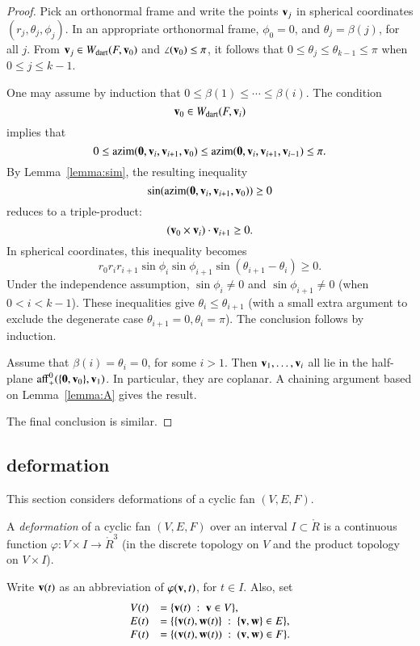 \begin{proof}  
Pick an orthonormal frame and write the points ${\mathbf v}_j$ in spherical coordinates $(r_j,\theta_j,\phi_j)$.  In an appropriate orthonormal frame, $\phi_0=0$, and $\theta_j=\beta(j)$, for all $j$.  From ${\mathbf v}_j\in W_{\text{dart}}(F,{\mathbf v}_0)$ and $\angle({\mathbf v}_0)\le\pi$, it follows that $0\le\theta_j\le\theta_{k-1}\le\pi$ when $0\le j\le k-1$.

 One may assume by induction that $0\le \beta(1)\le\cdots\le \beta(i)$.  The condition
$$
{\mathbf v}_0\in W_{\text{dart}}(F,{\mathbf v}_i)
$$
implies that
$$
0 \le {\operatorname{azim}}({\mathbf 0},{\mathbf v}_i,{\mathbf v}_{i+1},{\mathbf v}_0)\le {\operatorname{azim}}({\mathbf 0},{\mathbf v}_i,{\mathbf v}_{i+1},{\mathbf v}_{i-1})\le\pi.
$$
By Lemma~\ref{lemma:sim}, the resulting inequality
$$
\sin({\operatorname{azim}}({\mathbf 0},{\mathbf v}_i,{\mathbf v}_{i+1},{\mathbf v}_0))\ge 0
$$
reduces to a triple-product:
$$
({\mathbf v}_0 \times {\mathbf v}_i)\cdot {\mathbf v}_{i+1}\ge 0.
$$
In spherical coordinates, this inequality becomes
$$
r_0r_ir_{i+1}\sin\phi_i\sin\phi_{i+1}\sin(\theta_{i+1}-\theta_i)\ge0.
$$
Under the independence assumption, $\sin\phi_i\ne0$ and $\sin\phi_{i+1}\ne0$ (when $0< i < k-1$).    These inequalities give $\theta_i\le\theta_{i+1}$ (with a small extra argument to exclude the degenerate case $\theta_{i+1}=0,\theta_i=\pi$).  The conclusion follows by induction.

Assume that $\beta(i)=\theta_i=0$, for some $i>1$.  
Then ${\mathbf v}_1,\ldots,{\mathbf v}_i$ all lie in the
half-plane ${\operatorname{aff}}^0_+(\{{\mathbf 0},{\mathbf v}_0\},{\mathbf v}_1)$.  In particular, they are coplanar.  A chaining argument based on Lemma~\ref{lemma:A} gives the result.

The final conclusion is similar.
\end{proof}



\subsection{deformation}\label{sec:deformation}

This section considers deformations of a cyclic fan $(V,E,F)$.

\begin{definition}[deformation]
A {\it deformation} of a cyclic fan $(V,E,F)$ over an interval $I\subset\ring{R}$
is a 
continuous function $\varphi:V\times I \to\ring{R}^3$ (in the discrete topology on $V$ and the product topology on $V\times I$).
\end{definition}
%
%

Write ${\mathbf v}(t)$ as an abbreviation of $\varphi({\mathbf v},t)$, for $t\in I$.  
Also, set
$$
\begin{array}{lll}
V(t)&=\{{\mathbf v}(t) \ :\  {\mathbf v}\in V\},\\
E(t)&=\{\{{\mathbf v}(t),{\mathbf w}(t)\}\ :\  \{{\mathbf v},{\mathbf w}\}\in E\},\\
F(t)&= \{({\mathbf v}(t),{\mathbf w}(t)) \ :\   ({\mathbf v},{\mathbf w})\in F\}.
\end{array}
$$


